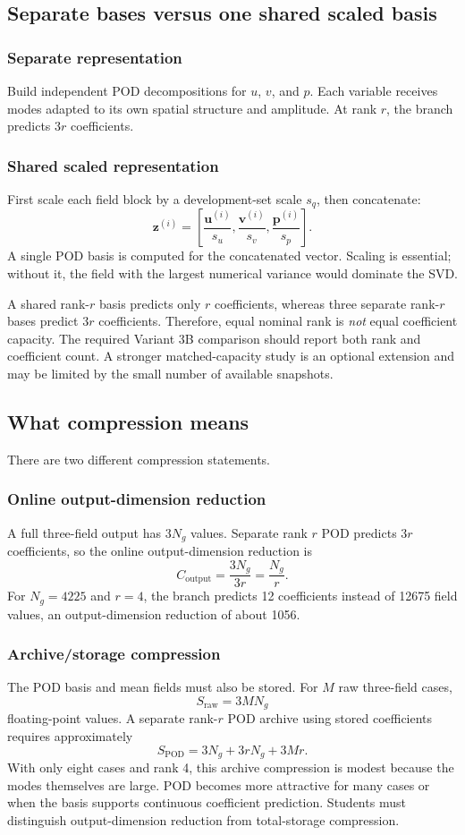\documentclass[11pt]{article}
\begin{document}
\subsection{Separate bases versus one shared scaled basis}
\subsubsection{Separate representation}
Build independent POD decompositions for $u$, $v$, and $p$. Each variable receives modes adapted to its own spatial structure and amplitude. At rank $r$, the branch predicts $3r$ coefficients.

\subsubsection{Shared scaled representation}
First scale each field block by a development-set scale $s_q$, then concatenate:
\[
\mathbf z^{(i)}=
\left[
\frac{\mathbf u^{(i)}}{s_u},
\frac{\mathbf v^{(i)}}{s_v},
\frac{\mathbf p^{(i)}}{s_p}
\right].
\]
A single POD basis is computed for the concatenated vector. Scaling is essential; without it, the field with the largest numerical variance would dominate the SVD.

A shared rank-$r$ basis predicts only $r$ coefficients, whereas three separate rank-$r$ bases predict $3r$ coefficients. Therefore, equal nominal rank is \emph{not} equal coefficient capacity. The required Variant 3B comparison should report both rank and coefficient count. A stronger matched-capacity study is an optional extension and may be limited by the small number of available snapshots.

\subsection{What compression means}
There are two different compression statements.

\subsubsection{Online output-dimension reduction}
A full three-field output has $3N_g$ values. Separate rank $r$ POD predicts $3r$ coefficients, so the online output-dimension reduction is
\[
C_{\mathrm{output}}=\frac{3N_g}{3r}=\frac{N_g}{r}.
\]
For $N_g=4225$ and $r=4$, the branch predicts 12 coefficients instead of 12675 field values, an output-dimension reduction of about 1056.

\subsubsection{Archive/storage compression}
The POD basis and mean fields must also be stored. For $M$ raw three-field cases,
\[
S_{\mathrm{raw}}=3MN_g
\]
floating-point values. A separate rank-$r$ POD archive using stored coefficients requires approximately
\[
S_{\mathrm{POD}}=3N_g+3rN_g+3Mr.
\]
With only eight cases and rank 4, this archive compression is modest because the modes themselves are large. POD becomes more attractive for many cases or when the basis supports continuous coefficient prediction. Students must distinguish output-dimension reduction from total-storage compression.
\end{document}
